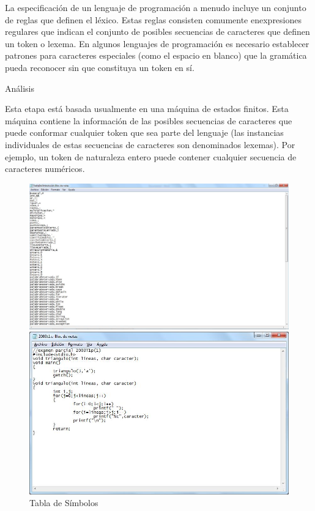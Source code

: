 \documentclass[10pt,oneside]{report}
\begin{document}
{La especificación de un lenguaje de programación a menudo incluye un conjunto de reglas que definen el léxico. Estas reglas consisten comumente enexpresiones regulares que indican el conjunto de posibles secuencias de caracteres que definen un token o lexema. En algunos lenguajes de programación es necesario establecer patrones para caracteres especiales (como el espacio en blanco) que la gramática pueda reconocer sin que constituya un token en sí. \newline \newline
\begin{bf} Análisis \end{bf} \newline \newline
Esta etapa está basada usualmente en una máquina de estados finitos. Esta máquina contiene la información de las posibles secuencias de caracteres que puede conformar cualquier token que sea parte del lenguaje (las instancias individuales de estas secuencias de caracteres son denominados lexemas). Por ejemplo, un token de naturaleza entero puede contener cualquier secuencia de caracteres numéricos.
\begin{figure}[t]
	\centering
	\includegraphics[width=.80\textwidth]{./imagenes/haskell1.jpg}
	\caption{Tabla de Símbolos}
	\includegraphics[width=.80\textwidth]{./imagenes/haskell2.jpg}

\end{figure}}
\end{document}
